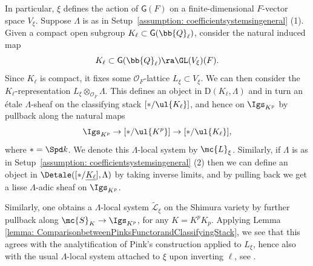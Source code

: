 \documentclass[letterpaper,11pt]{amsart}
\begin{document}
In particular, $\xi$ defines the action of $\mathsf{G}(F)$ on a finite-dimensional $F$-vector space $V_{\xi}$. Suppose $\Lambda$ is as in Setup~\ref{assumption: coefficientsystemsingeneral} (1). Given a compact open subgroup $K_{\ell} \subset \mathsf{G}(\bb{Q}_{\ell})$, consider the natural induced map 
\[ K_\ell\subset \mathsf{G}(\bb{Q}_{\ell}) \ra \GL(V_{\xi})(F).\]
Since $K_{\ell}$ is compact, it fixes some $\mathcal{O}_{F}$-lattice $L_{\xi}\subset V_{\xi}$. We can then consider the $K_{\ell}$-representation $L_{\xi} \otimes_{\mathcal{O}_{F}} \Lambda$. This defines an object in $\mathrm{D}(K_{\ell},\Lambda)$ and in turn an \'etale $\Lambda$-sheaf on the classifying stack $[\ast/\ul{K_\ell}]$, and hence on $\Igs_{K^p}$ by pullback along the natural maps
\begin{equation}{\label{eqn: TorsoronIgusaStack}}
\Igs_{K^p}\to [\ast/\ul{K^p}]\to [\ast/\ul{K_\ell}],
\end{equation}
where $\ast=\Spd k$. We denote this $\Lambda$-local system by $\mc{L}_\xi$. Similarly, if $\Lambda$ is as in Setup~\ref{assumption: coefficientsystemsingeneral} (2) then we can define an object in $\Detale([\ast/\underline{K_{\ell}}],\Lambda)$  by taking inverse limits, and by pulling back we get a lisse $\Lambda$-adic sheaf on $\Igs_{K^p}$.

Similarly, one obtains a $\Lambda$-local system $\tilde{\mathcal{L}}_\xi$ on the Shimura variety by further pullback along $\mc{S}_K\to \Igs_{K^p}$, for any $K=K^pK_p$. Applying Lemma \ref{lemma: ComparisonbetweenPinksFunctorandClassifyingStack}, we see that this agrees with the analytification of Pink's construction applied to $L_{\xi}$, hence also with the usual $\Lambda$-local system attached to $\xi$ upon inverting $\ell$, see \cite[Section~5.1]{PinkHigherDirectImages}. 
\end{document}
